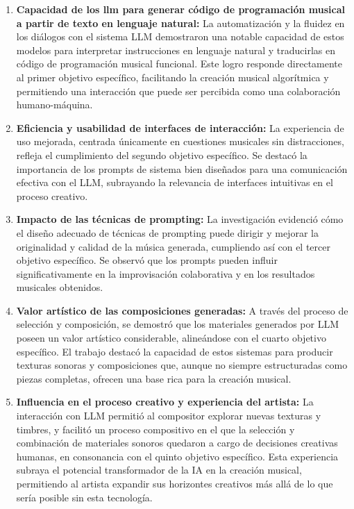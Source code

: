 \begin{enumerate}
    \item \textbf{Capacidad de los \gls{llm} para generar código de programación musical a partir de texto en lenguaje natural:} La automatización y la fluidez en los diálogos con el sistema LLM demostraron una notable capacidad de estos modelos para interpretar instrucciones en lenguaje natural y traducirlas en código de programación musical funcional. Este logro responde directamente al primer objetivo específico, facilitando la creación musical algorítmica y permitiendo una interacción que puede ser percibida como una colaboración humano-máquina.
    
    \item \textbf{Eficiencia y usabilidad de interfaces de interacción:} La experiencia de uso mejorada, centrada únicamente en cuestiones musicales sin distracciones, refleja el cumplimiento del segundo objetivo específico. Se destacó la importancia de los prompts de sistema bien diseñados para una comunicación efectiva con el LLM, subrayando la relevancia de interfaces intuitivas en el proceso creativo.
    
    \item \textbf{Impacto de las técnicas de prompting:} La investigación evidenció cómo el diseño adecuado de técnicas de prompting puede dirigir y mejorar la originalidad y calidad de la música generada, cumpliendo así con el tercer objetivo específico. Se observó que los prompts pueden influir significativamente en la improvisación colaborativa y en los resultados musicales obtenidos.
    
    \item \textbf{Valor artístico de las composiciones generadas:} A través del proceso de selección y composición, se demostró que los materiales generados por LLM poseen un valor artístico considerable, alineándose con el cuarto objetivo específico. El trabajo destacó la capacidad de estos sistemas para producir texturas sonoras y composiciones que, aunque no siempre estructuradas como piezas completas, ofrecen una base rica para la creación musical.
    
    \item \textbf{Influencia en el proceso creativo y experiencia del artista:} La interacción con LLM permitió al compositor explorar nuevas texturas y timbres, y facilitó un proceso compositivo en el que la selección y combinación de materiales sonoros quedaron a cargo de decisiones creativas humanas, en consonancia con el quinto objetivo específico. Esta experiencia subraya el potencial transformador de la IA en la creación musical, permitiendo al artista expandir sus horizontes creativos más allá de lo que sería posible sin esta tecnología.
\end{enumerate}